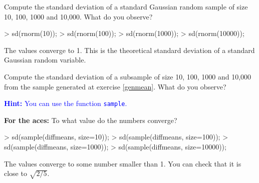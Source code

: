\documentclass[a4paper]{article}
\theoremstyle{definition}
\begin{document}
\begin{Exercise}
\label{sd}
Compute the standard deviation of a standard Gaussian random sample of
size 10, 100, 1000 and 10,000. What do you observe?
\end{Exercise}
\begin{Answer}
\begin{Schunk}
\begin{Sinput}
> sd(rnorm(10));
> sd(rnorm(100));
> sd(rnorm(1000));
> sd(rnorm(10000));
\end{Sinput}
\end{Schunk}
\par
The values converge to 1. This is the theoretical standard deviation
of a standard Gaussian random variable.
\end{Answer}

\begin{Exercise}
Compute the standard deviation of a subsample of size 10, 100, 1000 and
10,000 from the sample generated at exercise \ref{genmean}. What do you
observe?
\par\noindent\textcolor{Blue}{\textbf{Hint:} You can use the function
\texttt{sample}.}
\par\noindent\textcolor{BrickRed}{\textbf{For the aces:} To what
value do the numbers converge?}
\end{Exercise}
\begin{Answer}
\begin{Schunk}
\begin{Sinput}
> sd(sample(diffmeans, size=10));
> sd(sample(diffmeans, size=100));
> sd(sample(diffmeans, size=1000));
> sd(sample(diffmeans, size=10000));
\end{Sinput}
\end{Schunk}
\par
The values converge to some number smaller than 1. You can check that
it is close to $\sqrt{2/5}$.
\end{Answer}
\end{document}
